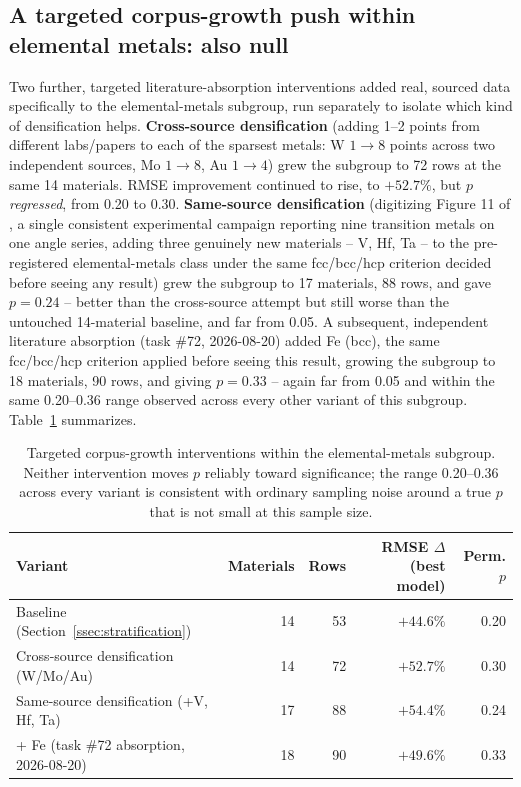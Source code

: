 \documentclass[aip,amsmath,amssymb,reprint]{revtex4-1}
\begin{document}
\subsection{A targeted corpus-growth push within elemental metals: also null}
\label{ssec:targeted_growth}

Two further, targeted literature-absorption interventions added real,
sourced data specifically to the elemental-metals subgroup, run
separately to isolate which kind of densification helps.
\textbf{Cross-source densification} (adding 1--2 points from
different labs/papers to each of the sparsest metals: W
$1\rightarrow 8$ points across two independent sources, Mo
$1\rightarrow 8$, Au $1\rightarrow 4$) grew the subgroup to 72 rows at
the same 14 materials. RMSE improvement continued to rise, to
$+52.7\%$, but $p$ \emph{regressed}, from 0.20 to 0.30.
\textbf{Same-source densification} (digitizing Figure 11 of
\citet{besnard2025}, a single consistent experimental campaign reporting nine
transition metals on one angle series, adding three genuinely new
materials -- V, Hf, Ta -- to the pre-registered elemental-metals class
under the same fcc/bcc/hcp criterion decided before seeing any result)
grew the subgroup to 17 materials, 88 rows, and gave $p=0.24$ --
better than the cross-source attempt but still worse than the
untouched 14-material baseline, and far from 0.05. A subsequent,
independent literature absorption (task \#72, 2026-08-20) added Fe
(bcc), the same fcc/bcc/hcp criterion applied
before seeing this result, growing the subgroup to 18 materials, 90
rows, and giving $p=0.33$ -- again far from 0.05 and within the same
0.20--0.36 range observed across every other variant of this subgroup.
Table~\ref{tab:targeted_growth} summarizes.

\begin{table}[htbp]
  \centering
  \caption{Targeted corpus-growth interventions within the
    elemental-metals subgroup. Neither intervention moves $p$
    reliably toward significance; the range 0.20--0.36 across every
    variant is consistent with ordinary sampling noise around a true
    $p$ that is not small at this sample size.}
  \label{tab:targeted_growth}
  \begin{tabular}{lrrrr}
    \toprule
    Variant & Materials & Rows & RMSE $\Delta$ (best model) & Perm. $p$ \\
    \midrule
    Baseline (Section~\ref{ssec:stratification}) & 14 & 53 & $+44.6\%$ & 0.20 \\
    Cross-source densification (W/Mo/Au)          & 14 & 72 & $+52.7\%$ & 0.30 \\
    Same-source densification (+V, Hf, Ta)        & 17 & 88 & $+54.4\%$ & 0.24 \\
    + Fe (task \#72 absorption, 2026-08-20)        & 18 & 90 & $+49.6\%$ & 0.33 \\
    \bottomrule
  \end{tabular}
\end{table}
\end{document}
